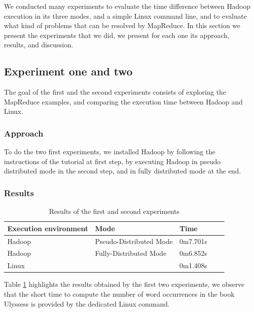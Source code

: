 \documentclass[10pt, conference]{IEEEtran}
\begin{document}
We conducted many experiments to evaluate the time difference between Hadoop execution in its three modes, and a simple Linux command line, and to evaluate what kind of problems that can be resolved by MapReduce. In this section we present the experiments that we did, we present for each one its approach, results, and discussion. 

\subsection{Experiment one and two}
The goal of the first and the second experiments consists of exploring the MapReduce examples, and comparing the execution time between Hadoop and Linux.
\subsubsection{Approach}
To do the two first experiments, we installed Hadoop by following the instructions of the tutorial \cite{tutorial} at first step, by executing Hadoop in pseudo distributed mode in the second step, and in fully distributed mode at the end. 
\subsubsection{Results}


\begin{center}
\begin{table}
\begin{center}
\begin{tabular}{|l|l|l|l|l|}
  \hline
 Execution environment & Mode & Time \\
  \hline
 Hadoop  & Pseudo-Distributed Mode & 0m7.701s \\
 Hadoop  & Fully-Distributed Mode & 0m6.852s \\
 Linux  & & 0m1.408s \\
  \hline
\end{tabular}

\caption{\label{ResultsExperiment1And2} Results of the first and second experiments}
\end{center}
\end{table}
\end{center}

Table \ref{ResultsExperiment1And2} highlights the results obtained by the first two experiments, we observe that the short time to compute the number of word occurrences in the book Ulyssess \cite{book0} is provided by the dedicated Linux command. 
\end{document}
